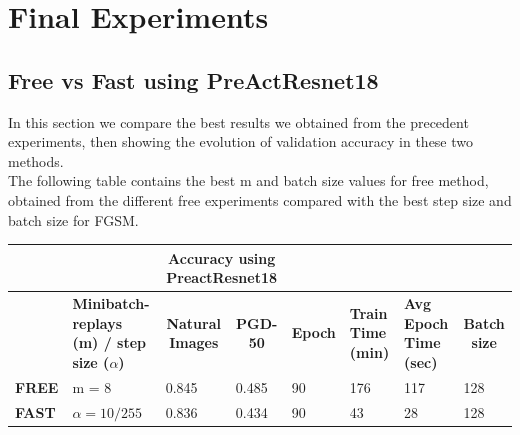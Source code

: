 \documentclass{article}
\begin{document}
\section{Final Experiments}
\subsection{Free vs Fast using PreActResnet18}
In this section we compare the best results we obtained from the precedent experiments,
then showing the evolution of validation accuracy in these two methods. 
\\
The following table contains the best m and batch size values for free method, obtained from the different free experiments compared with the best step size and batch size for FGSM. 
\begin{table}[hbt!]
\begin{tabular}{|l|p{2.1cm}|c|l|l|l|l|l|}
\hline
              & \multicolumn{1}{l|}{}         & \multicolumn{2}{c|}{\textbf{Accuracy using PreactResnet18}}                         & \multicolumn{3}{l|}{\textbf{}}                                                                                                            & \textbf{}                                \\ \hline
 & \textbf{Minibatch-replays (m) / step size ($\alpha$)} & \textbf{Natural Images}                      & \multicolumn{1}{c|}{\textbf{PGD-50}} & \multicolumn{1}{c|}{\textbf{Epoch}} & \multicolumn{1}{p{1cm}|}{\textbf{Train Time (min)}} & \multicolumn{1}{p{1cm}|}{\textbf{Avg Epoch Time (sec)}} & \multicolumn{1}{c|}{\textbf{Batch size}} \\ \hline
\textbf{FREE} & m = 8 & \multicolumn{1}{l|}{0.845} & { 0.485}         & { 90}           & { 176}                     & { 117}                         & { 128}               \\ \hline
\textbf{FAST} & $\alpha = 10/255$       & \multicolumn{1}{l|}{0.836} & { 0.434}         & { 90}           & { 43}                     & { 28}                         & { 128}               \\ \hline
\end{tabular}
\end{table}
\end{document}
